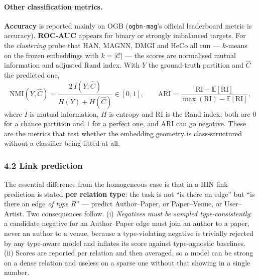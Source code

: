 \paragraph{Other classification metrics.} \textbf{Accuracy} is reported mainly on OGB
(\texttt{ogbn-mag}'s official leaderboard metric is accuracy). \textbf{ROC-AUC} appears for binary
or strongly imbalanced targets. For the \emph{clustering} probe that HAN, MAGNN, DMGI and HeCo all
run --- $k$-means on the frozen embeddings with $k=|\mathcal{C}|$ --- the scores are normalised
mutual information and adjusted Rand index. With $Y$ the ground-truth partition and $\hat{C}$ the
predicted one,
\[
  \mathrm{NMI}(Y,\hat{C})=\frac{2\,I(Y;\hat{C})}{H(Y)+H(\hat{C})}\in[0,1],
  \qquad
  \mathrm{ARI}=\frac{\mathrm{RI}-\mathbb{E}[\mathrm{RI}]}{\max(\mathrm{RI})-\mathbb{E}[\mathrm{RI}]},
\]
where $I$ is mutual information, $H$ is entropy and $\mathrm{RI}$ is the Rand index; both are $0$
for a chance partition and $1$ for a perfect one, and ARI can go negative. These are the metrics
that test whether the embedding geometry is class-structured without a classifier being fitted at
all.

\subsubsection*{4.2 Link prediction}

The essential difference from the homogeneous case is that in a HIN link prediction is stated
\textbf{per relation type}: the task is not ``is there an edge'' but ``is there an edge
\emph{of type $R$}'' --- predict Author--Paper, or Paper--Venue, or User--Artist. Two consequences
follow. (i) \emph{Negatives must be sampled type-consistently}: a candidate negative for an
Author--Paper edge must join an author to a paper, never an author to a venue, because a
type-violating negative is trivially rejected by any type-aware model and inflates its score
against type-agnostic baselines. (ii) Scores are reported per relation and then averaged, so a
model can be strong on a dense relation and useless on a sparse one without that showing in a
single number.

